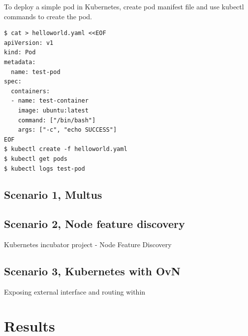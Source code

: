 \documentclass[english, 12pt, a4paper, elec, utf8, a-1b, online]{aaltothesis}
\begin{document}
To deploy a simple pod in Kubernetes, create pod manifest file and use kubectl commands to create the pod.

\begin{lstlisting}[basicstyle={\small\ttfamily}]
$ cat > helloworld.yaml <<EOF
apiVersion: v1
kind: Pod
metadata:
  name: test-pod
spec:
  containers:
  - name: test-container
    image: ubuntu:latest
    command: ["/bin/bash"]
    args: ["-c", "echo SUCCESS"]
EOF
$ kubectl create -f helloworld.yaml
$ kubectl get pods
$ kubectl logs test-pod
\end{lstlisting}

\subsection{Scenario 1, Multus}
\subsection{Scenario 2, Node feature discovery}
Kubernetes incubator project - Node Feature Discovery
\subsection{Scenario 3, Kubernetes with OvN}
Exposing external interface and routing within
\clearpage
\section{Results}
\end{document}
